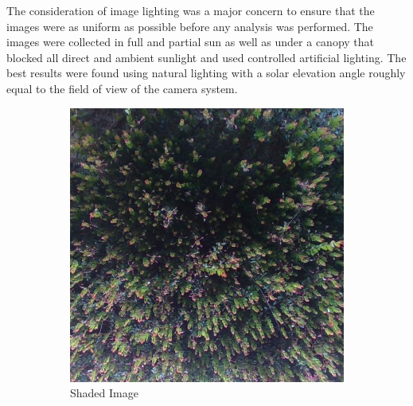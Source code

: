 The consideration of image lighting was a major concern to ensure that the images were as uniform as possible before any analysis was performed. The images were collected in full and partial sun as well as under a canopy that blocked all direct and ambient sunlight and used controlled artificial lighting. The best results were found using natural lighting with a solar elevation angle roughly equal to the field of view of the camera system.
    
\begin{figure}[!ht]
  \begin{subfigure}{0.3\textwidth}
    \includegraphics[width=\textwidth]{images/No-Light_7-119.JPG}
   \caption{Shaded Image}
    \label{fig:NoLight}
  \end{subfigure}
  \hfill
  \begin{subfigure}{0.3\textwidth}

\end{subfigure}
\end{figure}
